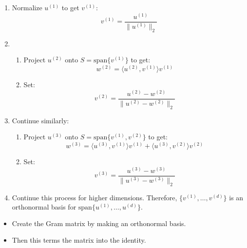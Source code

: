     \begin{process}
        \begin{enumerate}
            \item Normalize \( u^{(1)} \) to get \( v^{(1)} \):
            \[
            v^{(1)} = \frac{u^{(1)}}{\|u^{(1)}\|_2}
            \]
        
            \item 
            \begin{enumerate}
                \item Project \( u^{(2)} \) onto \( S = \text{span}\{v^{(1)}\} \) to get:
                \[
                w^{(2)} = \langle u^{(2)}, v^{(1)} \rangle v^{(1)}
                \]
        
                \item Set:
                \[
                v^{(2)} = \frac{u^{(2)} - w^{(2)}}{\|u^{(2)} - w^{(2)}\|_2}
                \]
            \end{enumerate}
        
            \item Continue similarly:
            \begin{enumerate}
                \item Project \( u^{(3)} \) onto \( S = \text{span}\{v^{(1)}, v^{(2)}\} \) to get:
                \[
                w^{(3)} = \langle u^{(3)}, v^{(1)} \rangle v^{(1)} + \langle u^{(3)}, v^{(2)} \rangle v^{(2)}
                \]
        
                \item Set:
                \[
                v^{(3)} = \frac{u^{(3)} - w^{(3)}}{\|u^{(3)} - w^{(3)}\|_2}
                \]
            \end{enumerate}
            
            \item Continue this process for higher dimensions. Therefore, \( \{v^{(1)}, \dots, v^{(d)}\} \) is an orthonormal basis for \( \text{span}\{u^{(1)}, \dots, u^{(d)}\} \).
        
        \end{enumerate}
    \end{process}

    \begin{intuition}
        \begin{itemize}
            \item Create the Gram matrix by making an orthonormal basis.
            \item Then this terms the matrix into the identity.
        \end{itemize}
    \end{intuition}

